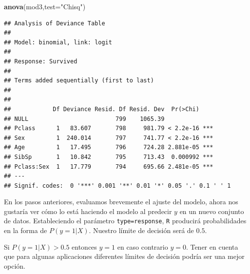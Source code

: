 \documentclass[]{book}
\newenvironment{Shaded}{\begin{snugshade}}{\end{snugshade}}
\newcommand{\KeywordTok}[1]{\textcolor[rgb]{0.13,0.29,0.53}{\textbf{#1}}}
\newcommand{\DataTypeTok}[1]{\textcolor[rgb]{0.13,0.29,0.53}{#1}}
\newcommand{\DecValTok}[1]{\textcolor[rgb]{0.00,0.00,0.81}{#1}}
\newcommand{\FloatTok}[1]{\textcolor[rgb]{0.00,0.00,0.81}{#1}}
\newcommand{\StringTok}[1]{\textcolor[rgb]{0.31,0.60,0.02}{#1}}
\newcommand{\OperatorTok}[1]{\textcolor[rgb]{0.81,0.36,0.00}{\textbf{#1}}}
\newcommand{\NormalTok}[1]{#1}
\begin{document}
\begin{Shaded}
\begin{Highlighting}[]
\KeywordTok{anova}\NormalTok{(mod3,}\DataTypeTok{test=}\StringTok{"Chisq"}\NormalTok{)}
\end{Highlighting}
\end{Shaded}

\begin{verbatim}
## Analysis of Deviance Table
## 
## Model: binomial, link: logit
## 
## Response: Survived
## 
## Terms added sequentially (first to last)
## 
## 
##            Df Deviance Resid. Df Resid. Dev  Pr(>Chi)    
## NULL                         799    1065.39              
## Pclass      1   83.607       798     981.79 < 2.2e-16 ***
## Sex         1  240.014       797     741.77 < 2.2e-16 ***
## Age         1   17.495       796     724.28 2.881e-05 ***
## SibSp       1   10.842       795     713.43  0.000992 ***
## Pclass:Sex  1   17.779       794     695.66 2.481e-05 ***
## ---
## Signif. codes:  0 '***' 0.001 '**' 0.01 '*' 0.05 '.' 0.1 ' ' 1
\end{verbatim}

En los pasos anteriores, evaluamos brevemente el ajuste del modelo,
ahora nos gustaría ver cómo lo está haciendo el modelo al predecir \(y\)
en un nuevo conjunto de datos. Estableciendo el parámetro
\texttt{type=\textquotesingle{}response\textquotesingle{}}, \texttt{R}
producirá probabilidades en la forma de \(P(y=1|X)\). Nuestro límite de
decisión será de \(0.5\).

Si \(P(y=1|X) > 0.5\) entonces \(y = 1\) en caso contrario \(y=0\).
Tener en cuenta que para algunas aplicaciones diferentes límites de
decisión podría ser una mejor opción.

\begin{Shaded}
\end{Shaded}
\end{document}
